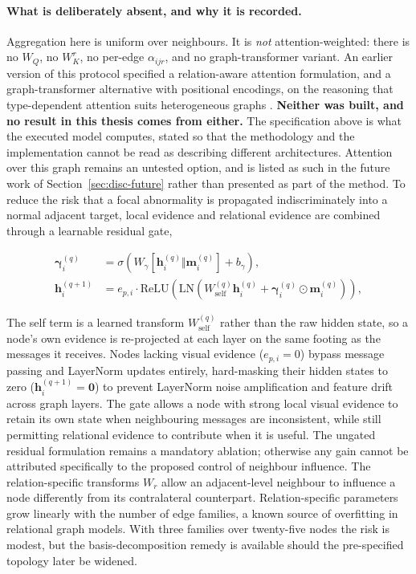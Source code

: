 \paragraph{What is deliberately absent, and why it is recorded.} Aggregation
here is uniform over neighbours. It is \emph{not} attention-weighted: there is
no $W_Q$, no $W_K^r$, no per-edge $\alpha_{ijr}$, and no graph-transformer
variant. An earlier version of this protocol specified a relation-aware
attention formulation, and a graph-transformer alternative with positional
encodings, on the reasoning that type-dependent attention suits heterogeneous
graphs \cite{velickovic2018graph,hu2020heterogeneous}. \textbf{Neither was
built, and no result in this thesis comes from either.} The specification above
is what the executed model computes, stated so that the methodology and the
implementation cannot be read as describing different architectures. Attention
over this graph remains an untested option, and is listed as such in the future
work of Section~\ref{sec:disc-future} rather than presented as part of the
method. To reduce the risk that a focal abnormality is propagated
indiscriminately into a normal adjacent target, local evidence and relational
evidence are combined through a learnable residual gate,

\begin{align}
\boldsymbol{\gamma}^{(q)}_i
&=
\sigma\!\left(
W_{\gamma}
[\mathbf{h}^{(q)}_i\Vert\mathbf{m}^{(q)}_i]
+b_{\gamma}
\right),\\
\mathbf{h}^{(q+1)}_i
&=
e_{p,i}\cdot
\mathrm{ReLU}\!\left(
\mathrm{LN}\!\left(
W^{(q)}_{\mathrm{self}}\mathbf{h}^{(q)}_i
+
\boldsymbol{\gamma}^{(q)}_i\odot\mathbf{m}^{(q)}_i
\right)\right),
\label{eq:gated-graph-update}
\end{align}

The self term is a learned transform $W^{(q)}_{\mathrm{self}}$ rather than the
raw hidden state, so a node's own evidence is re-projected at each layer on the
same footing as the messages it receives. Nodes lacking visual evidence ($e_{p,i}=0$) bypass message passing and LayerNorm updates entirely, hard-masking their hidden states to zero ($\mathbf{h}^{(q+1)}_i = \mathbf{0}$) to prevent LayerNorm noise amplification and feature drift across graph layers. The gate allows a node with
strong local visual evidence to retain its own state when neighbouring messages
are inconsistent, while still permitting relational evidence to contribute when
it is useful. The ungated residual formulation remains a mandatory ablation;
otherwise any gain cannot be attributed specifically to the proposed control of
neighbour influence. The relation-specific transforms $W_r$ allow an
adjacent-level neighbour to influence a node differently from its contralateral
counterpart. Relation-specific parameters grow linearly with the number of edge
families, a known source of overfitting in relational graph models. With three
families over twenty-five nodes the risk is modest, but the basis-decomposition
remedy \cite{schlichtkrull2018modeling} is available should the pre-specified
topology later be widened.

